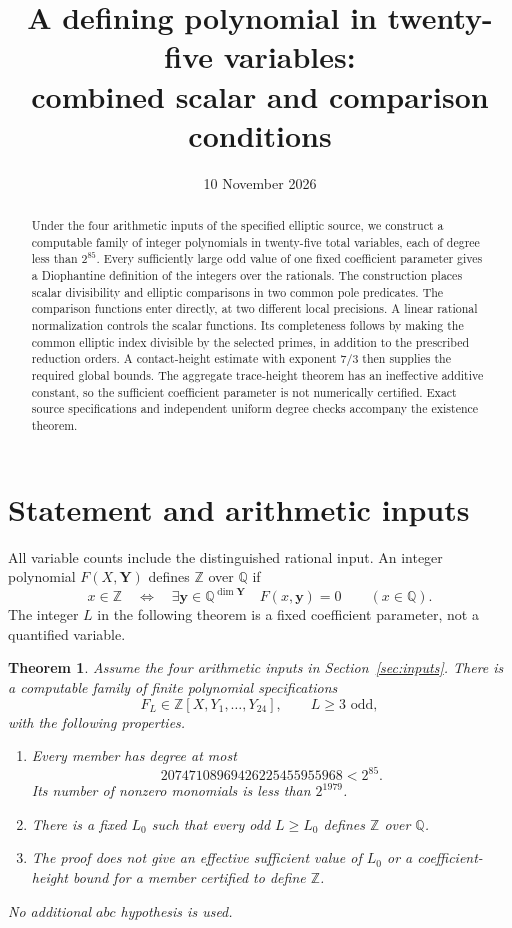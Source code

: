 \documentclass[11pt,a4paper]{article}
\title{A defining polynomial in twenty-five variables:\\
combined scalar and comparison conditions}
\author{}\date{10 November 2026}
\newtheorem{theorem}{Theorem}[section]
\newcommand{\Q}{\mathbb Q}\newcommand{\Z}{\mathbb Z}
\begin{document}
\maketitle
\begin{abstract}
Under the four arithmetic inputs of the specified elliptic source,
we construct a computable family of integer polynomials in twenty-five
total variables, each of degree less than $2^{85}$. Every sufficiently
large odd value of one fixed coefficient parameter gives a Diophantine
definition of the integers over the rationals. The construction places
scalar divisibility and elliptic comparisons in two common pole
predicates. The comparison functions enter directly, at two different
local precisions. A linear rational normalization controls the scalar
functions. Its completeness follows by making the common elliptic
index divisible by the selected primes, in addition to the prescribed
reduction orders. A contact-height estimate with exponent $7/3$
then supplies the required global bounds. The aggregate trace-height
theorem has an ineffective additive constant, so the sufficient
coefficient parameter is not numerically certified. Exact source
specifications and independent uniform degree checks accompany the
existence theorem.
\end{abstract}

\section{Statement and arithmetic inputs}

All variable counts include the distinguished rational input. An integer
polynomial $F(X,\mathbf Y)$ defines $\Z$ over $\Q$ if
\[
 x\in\Z\quad\Longleftrightarrow\quad
 \exists\mathbf y\in\Q^{\dim\mathbf Y}\quad F(x,\mathbf y)=0
 \qquad(x\in\Q).
\]
The integer $L$ in the following theorem is a fixed coefficient
parameter, not a quantified variable.

\begin{theorem}\label{thm:main}
Assume the four arithmetic inputs in Section~\ref{sec:inputs}.
There is a computable family of finite polynomial specifications
\[
 F_L\in\Z[X,Y_1,\ldots,Y_{24}],\qquad L\ge3\text{ odd},
\]
with the following properties.
\begin{enumerate}
\item Every member has degree at most
\[
 20747108969426225455955968<2^{85}.
\]
Its number of nonzero monomials is less than $2^{1979}$.
\item There is a fixed $L_0$ such that every odd $L\ge L_0$
defines $\Z$ over $\Q$.
\item The proof does not give an effective sufficient value of $L_0$
or a coefficient-height bound for a member certified to define $\Z$.
\end{enumerate}
No additional $abc$ hypothesis is used.
\end{theorem}
\end{document}
